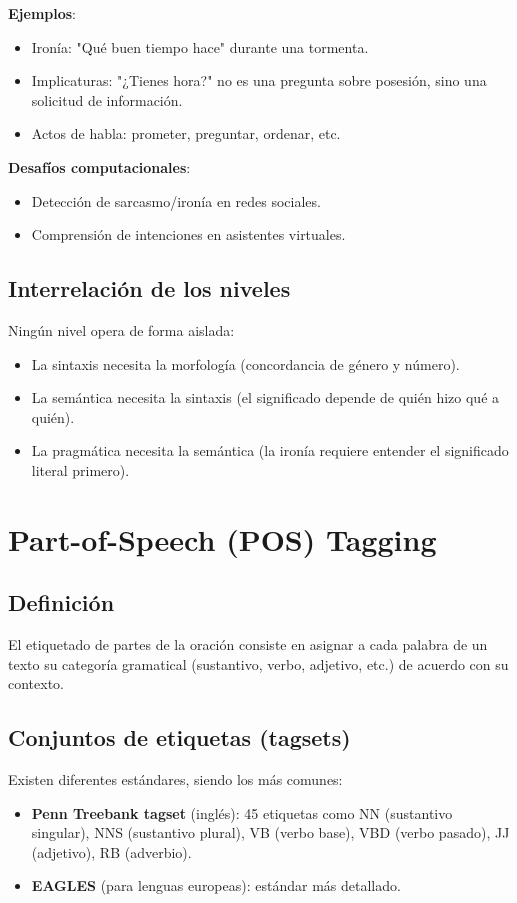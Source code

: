 \documentclass[12pt,a4paper,openany,oneside]{book}
\begin{document}
\textbf{Ejemplos}:
\begin{itemize}
    \item Ironía: "Qué buen tiempo hace" durante una tormenta.
    \item Implicaturas: "¿Tienes hora?" no es una pregunta sobre posesión, sino una solicitud de información.
    \item Actos de habla: prometer, preguntar, ordenar, etc.
\end{itemize}

\textbf{Desafíos computacionales}:
\begin{itemize}
    \item Detección de sarcasmo/ironía en redes sociales.
    \item Comprensión de intenciones en asistentes virtuales.
\end{itemize}

\subsection{Interrelación de los niveles}
Ningún nivel opera de forma aislada:
\begin{itemize}
    \item La sintaxis necesita la morfología (concordancia de género y número).
    \item La semántica necesita la sintaxis (el significado depende de quién hizo qué a quién).
    \item La pragmática necesita la semántica (la ironía requiere entender el significado literal primero).
\end{itemize}

\section{Part-of-Speech (POS) Tagging}

\subsection{Definición}
El etiquetado de partes de la oración consiste en asignar a cada palabra de un texto su categoría gramatical (sustantivo, verbo, adjetivo, etc.) de acuerdo con su contexto.

\subsection{Conjuntos de etiquetas (tagsets)}
Existen diferentes estándares, siendo los más comunes:
\begin{itemize}
    \item \textbf{Penn Treebank tagset} (inglés): 45 etiquetas como NN (sustantivo singular), NNS (sustantivo plural), VB (verbo base), VBD (verbo pasado), JJ (adjetivo), RB (adverbio).
    \item \textbf{EAGLES} (para lenguas europeas): estándar más detallado.
\end{itemize}
\end{document}

